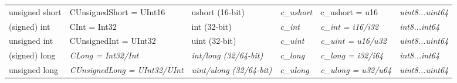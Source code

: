 \begin{table}[tbp]
\begin{adjustwidth}{-2.5cm}{}
\begin{tabular}{
>{\columncolor[HTML]{D9D9D9}}l lllll}
unsigned short                                                            & CUnsignedShort = UInt16                                                 & ushort (16-bit)                                                                        & \cellcolor[HTML]{CFE2F3}\textit{c\_ushort}                                   & c\_ushort = u16                                                                                                                                                      & \cellcolor[HTML]{CFE2F3}\textit{uint8...uint64}                       \\ 
(signed) int                                                              & CInt = Int32                                                            & int (32-bit)                                                                           & \cellcolor[HTML]{CFE2F3}\textit{c\_int}                                      & \cellcolor[HTML]{CFE2F3}\textit{c\_int = i16/i32}                                                                                                                  & \cellcolor[HTML]{CFE2F3}\textit{int8...int64}                         \\
unsigned int                                                              & CUnsignedInt = UInt32                                                   & uint (32-bit)                                                                          & \cellcolor[HTML]{CFE2F3}\textit{c\_uint}                                     & \cellcolor[HTML]{CFE2F3}\textit{c\_uint = u16/u32}                                                                                                                 & \cellcolor[HTML]{CFE2F3}\textit{uint8...uint64}                       \\
(signed) long                                                             & \cellcolor[HTML]{CFE2F3}\textit{CLong = Int32/Int}                      & \cellcolor[HTML]{CFE2F3}\textit{int/long (32/64-bit)}                       & \cellcolor[HTML]{CFE2F3}\textit{c\_long}                                     & \cellcolor[HTML]{CFE2F3}\textit{c\_long = i32/i64}                                                                                                                 & \cellcolor[HTML]{CFE2F3}\textit{int8...int64}                         \\
unsigned long                                                             & \cellcolor[HTML]{CFE2F3}\textit{CUnsignedLong = UInt32/UInt}            & \cellcolor[HTML]{CFE2F3}\textit{uint/ulong (32/64-bit)}                       & \cellcolor[HTML]{CFE2F3}\textit{c\_ulong}                                    & \cellcolor[HTML]{CFE2F3}\textit{c\_ulong = u32/u64}                                                                                                                & \cellcolor[HTML]{CFE2F3}\textit{uint8...uint64}                       \\

\end{tabular}
\end{adjustwidth}
\end{table}
